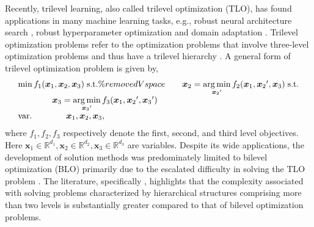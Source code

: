 \documentclass[letterpaper]{article} %
\begin{document}
Recently, trilevel learning, also called trilevel optimization (TLO), has found applications in many machine learning tasks, e.g., robust neural architecture search \cite{guo2020meets}, robust hyperparameter optimization \cite{sato2021gradient} and domain adaptation \cite{raghu2021meta}. Trilevel optimization problems refer to the optimization problems that involve three-level optimization problems and thus have a trilevel hierarchy \cite{avraamidou2018mixed,sato2021gradient}. A general form of trilevel optimization problem is given by,
\begin{equation}
\label{eq:trilevel}
\begin{array}{l}
\min  {{f_{1}}({\boldsymbol{x}_1},{\boldsymbol{x}_2},{\boldsymbol{x}_3})} \;{\rm{s}}.{\rm{t}}. \%removedVspace
\qquad {\boldsymbol{x}_2} = \mathop {\arg \min }\limits_{{\boldsymbol{x}_2}'}  {{f_{2}}({\boldsymbol{x}_1},{\boldsymbol{x}_2}',{\boldsymbol{x}_3})} \;{\rm{s}}.{\rm{t}}. \\
\qquad \qquad {\boldsymbol{x}_3} = \mathop {\arg \min }\limits_{{\boldsymbol{x}_3}'}  {{f_{3}}({\boldsymbol{x}_1},{\boldsymbol{x}_2}',{\boldsymbol{x}_3}')} \\
{\mathop{\rm var}}. \qquad \qquad {\boldsymbol{x}_1},{\boldsymbol{x}_2},{\boldsymbol{x}_3},
\end{array}
\end{equation}
where $f_1, f_2, f_3$ respectively denote the first, second, and third level objectives. Here $\boldsymbol{x}_1 \!\in\! \mathbb{R}^{d_1}, \boldsymbol{x}_2 \!\in\! \mathbb{R}^{d_2}, \boldsymbol{x}_3 \!\in\! \mathbb{R}^{d_3}$ are variables. Despite its wide applications, the development of solution methods was predominately limited
to bilevel optimization (BLO) \cite{ji2021bilevel,franceschi2018bilevel} primarily due to the escalated difficulty in solving the TLO problem \cite{sato2021gradient}. The literature, specifically \cite{blair1992computational,avraamidou2018mixed}, highlights that the complexity associated with solving problems characterized by hierarchical structures comprising more than two levels is substantially greater compared to that of bilevel optimization problems.
\end{document}
